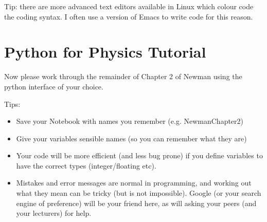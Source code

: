 \documentclass[%
 reprint,
 amsmath,amssymb,
 aps,
]{revtex4-1}
\begin{document}

Tip: there are more advanced text editors available in Linux which colour code the coding syntax. I often use a version of Emacs to write code for this reason. 



\section{Python for Physics Tutorial}

Now please work through the remainder of Chapter 2 of Newman \citep{newman} using the python interface of your choice. 

Tips: 
\begin{itemize}
\item Save your Notebook with names you remember (e.g. NewmanChapter2) 
\item Give your variables sensible names (so you can remember what they are)
\item Your code will be more efficient (and less bug prone) if you define variables to have the correct types (integer/floating etc). 
\item Mistakes and error messages are normal in programming, and working out what they mean can be tricky (but is not impossible). Google (or your search engine of preference) will be your friend here, as will asking your peers (and your lecturers) for help. 
\end{itemize}



\end{document}
